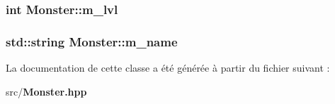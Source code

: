 \subsubsection[{m\-\_\-lvl}]{\setlength{\rightskip}{0pt plus 5cm}int Monster\-::m\-\_\-lvl\hspace{0.3cm}{\ttfamily [private]}}\label{class_monster_a8d1a55805e6607e882fc4da49fabacf0}
\subsubsection[{m\-\_\-name}]{\setlength{\rightskip}{0pt plus 5cm}std\-::string Monster\-::m\-\_\-name\hspace{0.3cm}{\ttfamily [private]}}\label{class_monster_ad5775421b7be86132f4e2e9df81a7d2b}


La documentation de cette classe a été générée à partir du fichier suivant \-:\begin{DoxyCompactItemize}
\item 
src/{\bf Monster.\-hpp}\end{DoxyCompactItemize}
